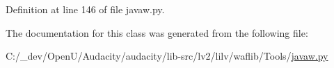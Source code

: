 Definition at line 146 of file javaw.\+py.



The documentation for this class was generated from the following file\+:\begin{DoxyCompactItemize}
\item 
C\+:/\+\_\+dev/\+Open\+U/\+Audacity/audacity/lib-\/src/lv2/lilv/waflib/\+Tools/\hyperlink{lilv_2waflib_2_tools_2javaw_8py}{javaw.\+py}\end{DoxyCompactItemize}
